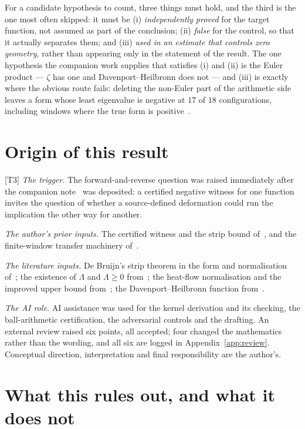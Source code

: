 \documentclass[11pt,a4paper]{article}
\theoremstyle{remark}
\newcommand{\tier}[1]{{\small\textsf{[#1]}}}
\begin{document}
For a candidate hypothesis to count, three things must hold, and the third is the one most
often skipped: it must be (i) \emph{independently proved} for the target function, not
assumed as part of the conclusion; (ii) \emph{false} for the control, so that it actually
separates them; and (iii) \emph{used in an estimate that controls zero geometry}, rather
than appearing only in the statement of the result. The one hypothesis the companion work
supplies that satisfies (i) and (ii) is the Euler product --- $\zeta$ has one and
Davenport--Heilbronn does not --- and (iii) is exactly where the obvious route fails:
deleting the non-Euler part of the arithmetic side leaves a form whose least eigenvalue is
negative at $17$ of $18$ configurations, including windows where the true form is
positive~\cite[\S15]{dhrep}.

\section{Origin of this result}\label{sec:origin}

\tier{T3} \emph{The trigger.} The forward-and-reverse question was raised immediately after
the companion note~\cite{dhnote} was deposited: a certified negative witness for one
function invites the question of whether a source-defined deformation could run the
implication the other way for another.

\emph{The author's prior inputs.} The certified witness and the strip bound of~\cite{dhnote},
and the finite-window transfer machinery of~\cite{deltaL3}.

\emph{The literature inputs.} De Bruijn's strip theorem in the form and normalisation
of~\cite[Thm.~7]{NW}; the existence of $\Lambda$ and $\Lambda\ge0$ from~\cite{RT};
the heat-flow normalisation and the improved upper bound from~\cite{P15}; the
Davenport--Heilbronn function from~\cite{DH36,BG11}.

\emph{The AI role.} AI assistance was used for the kernel derivation and its checking, the
ball-arithmetic certification, the adversarial controls and the drafting. An external review
raised six points, all accepted; four changed the mathematics rather than the wording, and
all six are logged in Appendix~\ref{app:review}. Conceptual direction, interpretation and
final responsibility are the author's.

\section{What this rules out, and what it does not}\label{sec:scope}
\end{document}
